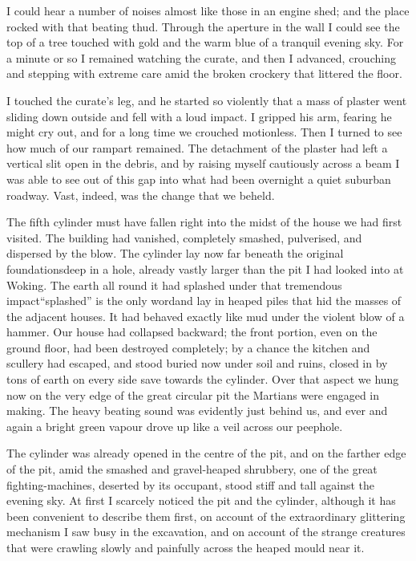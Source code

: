 I could hear a number of noises almost like those in an engine
shed; and the place rocked with that beating thud. Through the
aperture in the wall I could see the top of a tree touched with
gold and the warm blue of a tranquil evening sky. For a minute or
so I remained watching the curate, and then I advanced, crouching
and stepping with extreme care amid the broken crockery that
littered the floor.

I touched the curate's leg, and he started so violently that a mass
of plaster went sliding down outside and fell with a loud impact. I
gripped his arm, fearing he might cry out, and for a long time we
crouched motionless. Then I turned to see how much of our rampart
remained. The detachment of the plaster had left a vertical slit
open in the debris, and by raising myself cautiously across a beam
I was able to see out of this gap into what had been overnight a
quiet suburban roadway. Vast, indeed, was the change that we
beheld.

The fifth cylinder must have fallen right into the midst of the
house we had first visited. The building had vanished, completely
smashed, pulverised, and dispersed by the blow. The cylinder lay
now far beneath the original foundations\dash{}deep in a hole, already
vastly larger than the pit I had looked into at Woking. The earth
all round it had splashed under that tremendous impact\dash{}``splashed''
is the only word\dash{}and lay in heaped piles that hid the masses of
the adjacent houses. It had behaved exactly like mud under the
violent blow of a hammer. Our house had collapsed backward; the
front portion, even on the ground floor, had been destroyed
completely; by a chance the kitchen and scullery had escaped, and
stood buried now under soil and ruins, closed in by tons of earth
on every side save towards the cylinder. Over that aspect we hung
now on the very edge of the great circular pit the Martians were
engaged in making. The heavy beating sound was evidently just
behind us, and ever and again a bright green vapour drove up like a
veil across our peephole.

The cylinder was already opened in the centre of the pit, and on
the farther edge of the pit, amid the smashed and gravel-heaped
shrubbery, one of the great fighting-machines, deserted by its
occupant, stood stiff and tall against the evening sky. At first I
scarcely noticed the pit and the cylinder, although it has been
convenient to describe them first, on account of the extraordinary
glittering mechanism I saw busy in the excavation, and on account
of the strange creatures that were crawling slowly and painfully
across the heaped mould near it.

